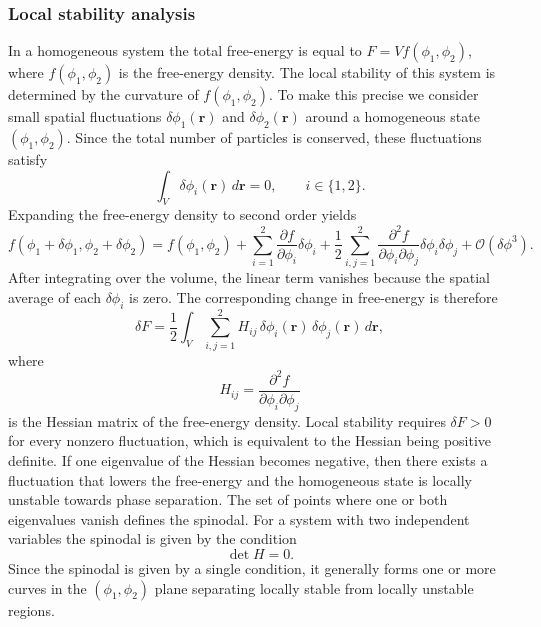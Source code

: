 \documentclass[12pt]{article}
\begin{document}
\subsubsection{Local stability analysis}
In a homogeneous system the total free-energy is equal to \(F = V f(\phi_1, \phi_2)\), where \(f(\phi_1,\phi_2)\) is the free-energy density. The local stability of this system is determined by the curvature of \(f(\phi_1,\phi_2)\).
To make this precise we consider small spatial fluctuations \(\delta \phi_1(\mathbf{r})\) and \(\delta \phi_2(\mathbf{r})\) around a homogeneous state \((\phi_1,\phi_2)\). Since the total number of particles is conserved, these fluctuations satisfy
\[
    \int_V \delta \phi_i(\mathbf{r})\, d\mathbf{r} = 0, \qquad i \in \{1,2\}.
\]
Expanding the free-energy density to second order yields
\[
    f(\phi_1 + \delta \phi_1, \phi_2 + \delta \phi_2)
    = f(\phi_1,\phi_2)
    + \sum_{i=1}^2 \frac{\partial f}{\partial \phi_i} \delta \phi_i
    + \frac{1}{2} \sum_{i,j=1}^2 \frac{\partial^2 f}{\partial \phi_i \partial \phi_j} \delta \phi_i \delta \phi_j
    + \mathcal{O}(\delta \phi^3).
\]
After integrating over the volume, the linear term vanishes because the spatial average of each \(\delta \phi_i\) is zero. The corresponding change in free-energy is therefore
\[
    \delta F = \frac{1}{2} \int_V \sum_{i,j=1}^2 H_{ij} \, \delta \phi_i(\mathbf{r}) \, \delta \phi_j(\mathbf{r}) \, d\mathbf{r},
\]
where
\[
    H_{ij} = \frac{\partial^2 f}{\partial \phi_i \partial \phi_j}
\]
is the Hessian matrix of the free-energy density. Local stability requires \(\delta F > 0\) for every nonzero fluctuation, which is equivalent to the Hessian being positive definite.
If one eigenvalue of the Hessian becomes negative, then there exists a fluctuation that lowers the free-energy and the homogeneous state is locally unstable towards phase separation.
The set of points where one or both eigenvalues vanish defines the spinodal. For a system with two independent variables the spinodal is given by the condition
\[
    \det H = 0.
\]
Since the spinodal is given by a single condition, it generally forms one or more curves in the \((\phi_1, \phi_2)\) plane separating locally stable from locally unstable regions.
\end{document}
